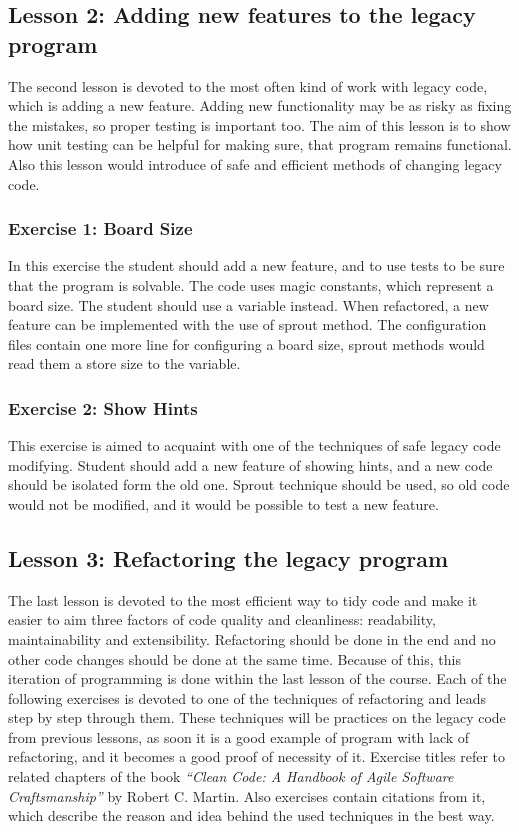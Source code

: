         
        \subsection{Lesson 2: Adding new features to the legacy program}
        The second lesson is devoted to the most often kind of work with legacy code, which is adding a new feature. Adding new functionality may be as risky as fixing the mistakes, so proper testing is important too. The aim of this lesson is to show how unit testing can be helpful for making sure, that program remains functional. Also this lesson would introduce of safe and efficient methods of changing legacy code.
        
            \subsubsection{Exercise 1: Board Size}
            In this exercise the student should add a new feature, and to use tests to be sure that the program is solvable. The code uses magic constants, which represent a board size. The student should use a variable instead. When refactored, a new feature can be implemented with the use of sprout method. The configuration files contain one more line for configuring a board size, sprout methods would read them a store size to the variable.
        
            \subsubsection{Exercise 2: Show Hints}
            This exercise is aimed to acquaint with one of the techniques of safe legacy code modifying. Student should add a new feature of showing hints, and a new code should be isolated form the old one. Sprout technique should be used, so old code would not be modified, and it would be possible to test a new feature.
        
        \subsection{Lesson 3: Refactoring the legacy program}
        The last lesson is devoted to the most efficient way to tidy code and make it easier to aim three factors of code quality and cleanliness: readability, maintainability and extensibility. Refactoring should be done in the end and no other code changes should be done at the same time. Because of this, this iteration of programming is done within the last lesson of the course. Each of the following exercises is devoted to one of the techniques of refactoring and leads step by step through them. These techniques will be practices on the legacy code from previous lessons, as soon it is a good example of program with lack of refactoring, and it becomes a good proof of necessity of it. Exercise titles refer to related chapters of the book \textit{``Clean Code: A Handbook of Agile Software Craftsmanship''} by Robert C. Martin. Also exercises contain citations from it, which describe the reason and idea behind the used techniques in the best way.
        
